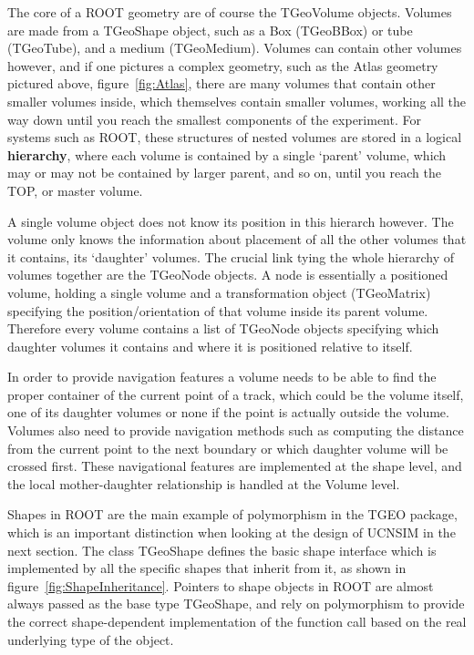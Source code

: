\documentclass[11pt,a4paper,oneside]{article}
\begin{document}
The core of a ROOT geometry are of course the TGeoVolume objects. Volumes are made from a TGeoShape object, such as a Box (TGeoBBox) or tube (TGeoTube), and a medium (TGeoMedium). Volumes can contain other volumes however, and if one pictures a complex geometry, such as the Atlas geometry pictured above, figure~\ref{fig:Atlas}, there are many volumes that contain other smaller volumes inside, which themselves contain smaller volumes, working all the way down until you reach the smallest components of the experiment. For systems such as ROOT, these structures of nested volumes are stored in a logical \textbf{hierarchy}, where each volume is contained by a single `parent' volume, which may or may not be contained by larger parent, and so on, until you reach the TOP, or master volume.

A single volume object does not know its position in this hierarch however. The volume only knows the information about placement of all the other volumes that it contains, its `daughter' volumes. The crucial link tying the whole hierarchy of volumes together are the TGeoNode objects. A node is essentially a positioned volume, holding a single volume and a transformation object (TGeoMatrix) specifying the position/orientation of that volume inside its parent volume. Therefore every volume contains a list of TGeoNode objects specifying which daughter volumes it contains and where it is positioned relative to itself. 

In order to provide navigation features a volume needs to be able to find the proper container of the current point of a track, which could be the volume itself, one of its daughter volumes or none if the point is actually outside the volume. Volumes also need to provide navigation methods such as computing the distance from the current point to the next boundary or which daughter volume will be crossed first. These navigational features are implemented at the shape level, and the local mother-daughter relationship is handled at the Volume level. 

Shapes in ROOT are the main example of polymorphism in the TGEO package, which is an important distinction when looking at the design of UCNSIM in the next section. The class TGeoShape defines the basic shape interface which is implemented by all the specific shapes that inherit from it, as shown in figure~\ref{fig:ShapeInheritance}. Pointers to shape objects in ROOT are almost always passed as the base type TGeoShape, and rely on polymorphism to provide the correct shape-dependent implementation of the function call based on the real underlying type of the object. 
\end{document}
